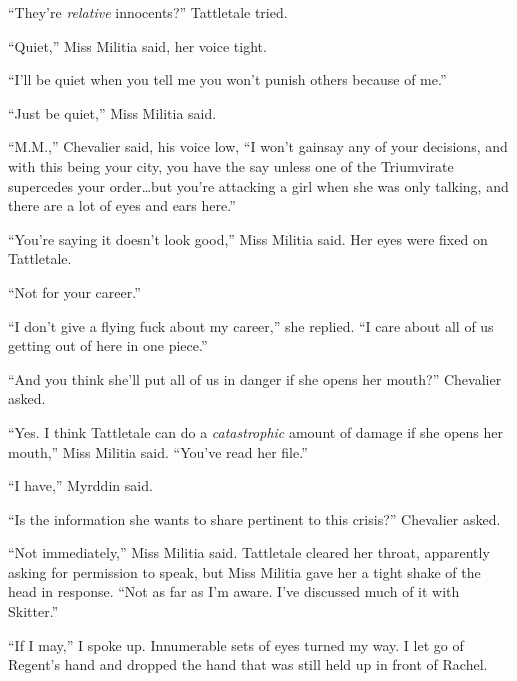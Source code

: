 ``They're \emph{relative} innocents?'' Tattletale tried.



``Quiet,'' Miss Militia said, her voice tight.



``I'll be quiet when you tell me you won't punish others because of me.''



``Just be quiet,'' Miss Militia said.



``M.M.,'' Chevalier said, his voice low, ``I won't gainsay any of your decisions, and with this being your city, you have the say unless one of the Triumvirate supercedes your order\ldots but you're attacking a girl when she was only talking, and there are a lot of eyes and ears here.''



``You're saying it doesn't look good,'' Miss Militia said.  Her eyes were fixed on Tattletale.



``Not for your career.''



``I don't give a flying fuck about my career,'' she replied.  ``I care about all of us getting out of here in one piece.''



``And you think she'll put all of us in danger if she opens her mouth?'' Chevalier asked.



``Yes.  I think Tattletale can do a \emph{catastrophic} amount of damage if she opens her mouth,'' Miss Militia said.  ``You've read her file.''



``I have,'' Myrddin said.



``Is the information she wants to share pertinent to this crisis?''  Chevalier asked.



``Not immediately,'' Miss Militia said.  Tattletale cleared her throat, apparently asking for permission to speak, but Miss Militia gave her a tight shake of the head in response.  ``Not as far as I'm aware.  I've discussed much of it with Skitter.''



``If I may,'' I spoke up.  Innumerable sets of eyes turned my way.  I let go of Regent's hand and dropped the hand that was still held up in front of Rachel.



